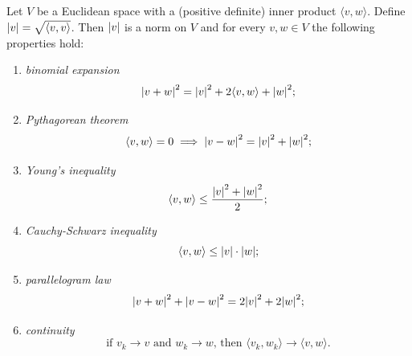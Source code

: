 \begin{theorem}
\label{th:spazio_euclideo}%
Let $V$ be a Euclidean space with a (positive definite) inner product $\langle
v, w\rangle$.
Define ${\left|v\right|} = \sqrt{\langle v,v\rangle}$.
Then ${\left|v\right|}$ is a norm on $V$
and for every $v,w\in V$ the following properties hold:
\begin{enumerate}
\item \emph{binomial expansion}%
%
\begin{equation}\label{eq:binomio_vettoriale}%
  \abs{v+w}^2 = \abs{v}^2 + 2 \langle v,w\rangle + \abs{w}^2;
\end{equation}
\item \emph{Pythagorean theorem}%
%
%
\begin{equation}\label{eq:Pitagora}
  \langle v,w\rangle=0 \implies {\left|v-w\right|}^2 = {\left|v\right|}^2 + {\left|w\right|}^2;
\end{equation}
\item \emph{Young's inequality}%
%
%
\begin{equation}\label{eq:Young}
  \langle v,w\rangle \le \frac{{\left|v\right|}^2 + {\left|w\right|}^2}{2};
\end{equation}
\item \emph{Cauchy-Schwarz inequality}%
%
%
%
\begin{equation}\label{eq:Cauchy_Schwarz}
   \langle v,w \rangle \le {\left|v\right|} \cdot {\left|w\right|};
\end{equation}
\item \emph{parallelogram law}%
%
\begin{equation}\label{eq:parallelogramma}
  {\left|v+w\right|}^2 + {\left|v-w\right|}^2 = 2 {\left|v\right|}^2 + 2{\left|w\right|}^2;
\end{equation}
\item \emph{continuity}
\[
  \text{if $v_k\to v$ and $w_k\to w$, then
  $\langle v_k,w_k\rangle \to \langle v,w \rangle$}.
\]
\end{enumerate}
\end{theorem}
%
